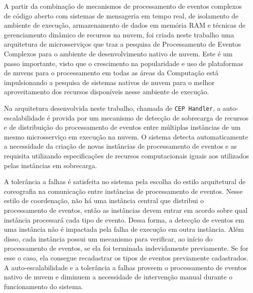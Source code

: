 A partir da combinação de mecanismos de processamento de eventos complexos de código aberto com sistemas de mensageria em tempo real, de isolamento de ambiente de execução, armazenamento de dados em memória RAM e técnicas de gerenciamento dinâmico de recursos na nuvem, foi criada neste trabalho uma arquitetura de microsserviços que traz a pesquisa de Processamento de Eventos Complexos para o ambiente de desenvolvimento nativo de nuvem. Este é um passo importante, visto que o crescimento na popularidade e uso de plataformas de nuvens para o processamento em todas as áreas da Computação está impulsionando a pesquisa de sistemas nativos de nuvem para o melhor aproveitamento dos recursos disponíveis nesse ambiente de execução.

Na arquitetura desenvolvida neste trabalho, chamada de \texttt{CEP Handler}, a auto-escalabilidade é provida por um mecanismo de detecção de sobrecarga de recursos e de distribuição do processamento de eventos entre múltiplas instâncias de um mesmo microsserviço em execução na nuvem. O sistema detecta automaticamente a necessidade da criação de novas instâncias de processamento de eventos e as requisita utilizando especificações de recursos computacionais iguais aos utilizados pelas instâncias em sobrecarga. 

A tolerância a falhas é satisfeita no sistema pela escolha do estilo arquitetural de coreografia na comunicação entre instâncias de processamento de eventos. Nesse estilo de coordenação, não há uma instância central que distribui o processamento de eventos, então as instâncias devem entrar em acordo sobre qual instância processará cada tipo de evento. Dessa forma, a detecção de eventos em uma instância não é impactada pela falha de execução em outra instância. Além disso, cada instância possui um mecanismo para verificar, ao início do processamento de eventos, se ela foi terminada indevidamente previamente. Se for esse o caso, ela consegue recadastrar os tipos de eventos previamente cadastrados. 
A auto-escalabilidade e a tolerância a falhas proveem o processamento de eventos nativo de nuvem e diminuem a necessidade de intervenção manual durante o funcionamento do sistema. 

